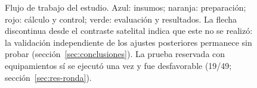 \begin{figure}[htbp]
\caption{Flujo de trabajo del estudio. Azul: insumos; naranja: preparación; rojo: cálculo y control; verde: evaluación y resultados. La flecha discontinua desde el contraste satelital indica que este no se realizó: la validación independiente de los ajustes posteriores permanece sin probar (sección~\ref{sec:conclusiones}). La prueba reservada con equipamientos sí se ejecutó una vez y fue desfavorable (19/49; sección~\ref{sec:res-ronda}).}\label{fig:flujo}
\end{figure}
